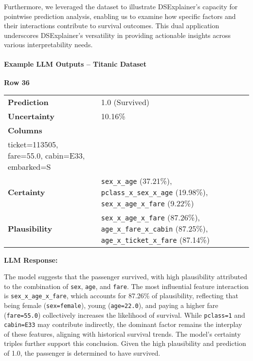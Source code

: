 \documentclass[acmlarge]{acmart}
\begin{document}
Furthermore, we leveraged the dataset to illustrate DSExplainer's capacity for pointwise prediction analysis, enabling us to examine how specific factors and their interactions contribute to survival outcomes. This dual application underscores DSExplainer's versatility in providing actionable insights across various interpretability needs.



\paragraph{Example LLM Outputs – Titanic Dataset}

\begin{adjustwidth}{0.5cm}{0.5cm}

\textbf{Row 36}
\vspace{0.3em}

\begin{tabularx}{\textwidth}{@{}lX@{}}
\toprule
\textbf{Prediction} & 1.0 (Survived) \\
\textbf{Uncertainty} & 10.16\% \\
\textbf{Columns} & \begin{tabular}[t]{@{}l@{}}
pclass=1, sex=female, age=22.0, sibsp=0, parch=1,\\
ticket=113505, fare=55.0, cabin=E33, embarked=S
\end{tabular} \\
\textbf{Certainty} & \texttt{sex\_x\_age} (37.21\%), \texttt{pclass\_x\_sex\_x\_age} (19.98\%), \texttt{sex\_x\_age\_x\_fare} (9.22\%) \\
\textbf{Plausibility} & \texttt{sex\_x\_age\_x\_fare} (87.26\%), \texttt{age\_x\_fare\_x\_cabin} (87.25\%), \texttt{age\_x\_ticket\_x\_fare} (87.14\%) \\
\bottomrule
\end{tabularx}

\vspace{0.5em}
\noindent\textbf{LLM Response:}

The model suggests that the passenger survived, with high plausibility attributed to the combination of \texttt{sex}, \texttt{age}, and \texttt{fare}. The most influential feature interaction is \texttt{sex\_x\_age\_x\_fare}, which accounts for 87.26\% of plausibility, reflecting that being female (\texttt{sex=female}), young (\texttt{age=22.0}), and paying a higher fare (\texttt{fare=55.0}) collectively increases the likelihood of survival. While \texttt{pclass=1} and \texttt{cabin=E33} may contribute indirectly, the dominant factor remains the interplay of these features, aligning with historical survival trends. The model’s certainty triples further support this conclusion. Given the high plausibility and prediction of 1.0, the passenger is determined to have survived.


\end{adjustwidth}
\end{document}
